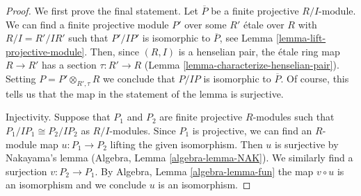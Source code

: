 \documentclass[10pt,a4paper]{amsart}
\theoremstyle{plain}
\theoremstyle{definition}
\theoremstyle{remark}
\numberwithin{equation}{subsection}
\begin{document}
\begin{proof}
We first prove the final statement. Let $\overline{P}$ be a finite
projective $R/I$-module. We can find a finite projective module $P'$
over some $R'$ \'etale over $R$ with $R/I = R'/IR'$ such that
$P'/IP'$ is isomorphic to $\overline{P}$, see
Lemma \ref{lemma-lift-projective-module}.
Then, since $(R, I)$ is a henselian pair, the \'etale ring map $R \to R'$ has
a section $\tau : R' \to R$ (Lemma \ref{lemma-characterize-henselian-pair}).
Setting $P = P' \otimes_{R', \tau} R$ we conclude that $P/IP$
is isomorphic to $\overline{P}$. Of course, this tells us that
the map in the statement of the lemma is surjective.

\medskip\noindent
Injectivity. Suppose that $P_1$ and $P_2$ are finite projective $R$-modules such
that $P_1/IP_1 \cong P_2/IP_2$ as $R/I$-modules. Since $P_1$ is projective,
we can find an $R$-module map $u : P_1 \to P_2$ lifting the given isomorphism.
Then $u$ is surjective by Nakayama's lemma
(Algebra, Lemma \ref{algebra-lemma-NAK}).
We similarly find a surjection $v : P_2 \to P_1$.
By Algebra, Lemma \ref{algebra-lemma-fun} the map $v \circ u$
is an isomorphism and we conclude $u$ is an isomorphism.
\end{proof}
\end{document}
